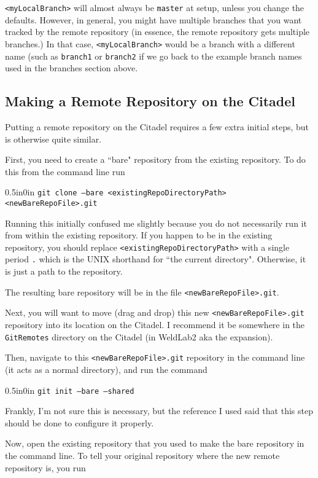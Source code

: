 \documentclass[11pt]{article}
\newcommand{\code}[1]{\begin{adjustwidth}{0.5in}{0in}
    \texttt{#1}
    \end{adjustwidth}}
\begin{document}
\texttt{<myLocalBranch>} will almost always be \texttt{master} at setup, unless you change the defaults.  However, in general, you might have multiple branches that you want tracked by the remote repository (in essence, the remote repository gets multiple branches.)  In that case, \texttt{<myLocalBranch>} would be a branch with a different name (such as \texttt{branch1} or \texttt{branch2} if we go back to the example branch names used in the branches section above.

\subsection{Making a Remote Repository on the Citadel}

Putting a remote repository on the Citadel requires a few extra initial steps, but is otherwise quite similar.  

First, you need to create a ``bare" repository from the existing repository.  To do this from the command line run

\code{git clone --bare <existingRepoDirectoryPath> <newBareRepoFile>.git}

Running this initially confused me slightly because you do not necessarily run it from within the existing repository.  If you happen to be in the existing repository, you should replace \texttt{<existingRepoDirectoryPath>} with a single period \texttt{.} which is the UNIX shorthand for ``the current directory".  Otherwise, it is just a path to the repository.

The resulting bare repository will be in the file \texttt{<newBareRepoFile>.git}.

Next, you will want to move (drag and drop) this new \texttt{<newBareRepoFile>.git} repository into its location on the Citadel.  I recommend it be somewhere in the \texttt{GitRemotes} directory on the Citadel (in WeldLab2 aka the expansion).

Then, navigate to this \texttt{<newBareRepoFile>.git} repository in the command line (it acts as a normal directory), and run the command

\code{git init --bare --shared}

Frankly, I'm not sure this is necessary, but the reference I used said that this step should be done to configure it properly.

Now, open the existing repository that you used to make the bare repository in the command line.  To tell your original repository where the new remote repository is, you run
\end{document}
